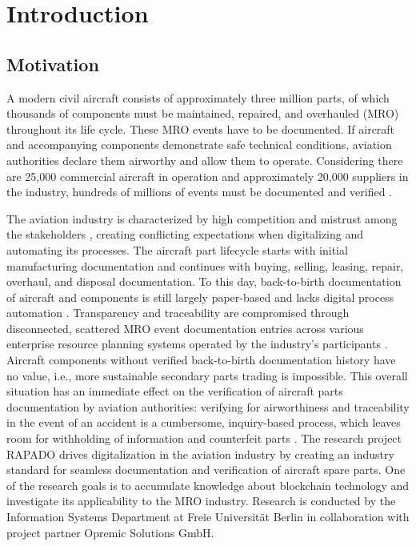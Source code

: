 \chapter{Introduction}
\section{Motivation}
A modern civil aircraft consists of approximately three million parts, of which thousands of components must be maintained, repaired, and overhauled (MRO) throughout its life cycle. These MRO events have to be documented. If aircraft and accompanying components demonstrate safe technical conditions, aviation authorities declare them airworthy and allow them to operate. Considering there are 25,000 commercial aircraft in operation and approximately 20,000 suppliers in the industry, hundreds of millions of events must be documented and verified \citep{mroBCservices1}.

The aviation industry is characterized by high competition and mistrust among the stakeholders \citep{Chatzi2019TDoC}, creating conflicting expectations when digitalizing and automating its processes. The aircraft part lifecycle starts with initial manufacturing documentation and continues with buying, selling, leasing, repair, overhaul, and disposal documentation. To this day, back-to-birth documentation of aircraft and components is still largely paper-based and lacks digital process automation \citep{efthymiou}. Transparency and traceability are compromised through disconnected, scattered MRO event documentation entries across various enterprise resource planning systems operated by the industry's participants \citep{mroBCservices1}. Aircraft components without verified back-to-birth documentation history have no value, i.e., more sustainable secondary parts trading is impossible. This overall situation has an immediate effect on the verification of aircraft parts documentation by aviation authorities: verifying for airworthiness and traceability in the event of an accident is a cumbersome, inquiry-based process, which leaves room for withholding of information and counterfeit parts \citep{planecrash}. 
The research project RAPADO drives digitalization in the aviation industry by creating an industry standard for seamless documentation and verification of aircraft spare parts. One of the research goals is to accumulate knowledge about blockchain technology and investigate its applicability to the MRO industry. Research is conducted by the Information Systems Department at Freie Universit{\"a}t Berlin in collaboration with project partner Opremic Solutions GmbH.

